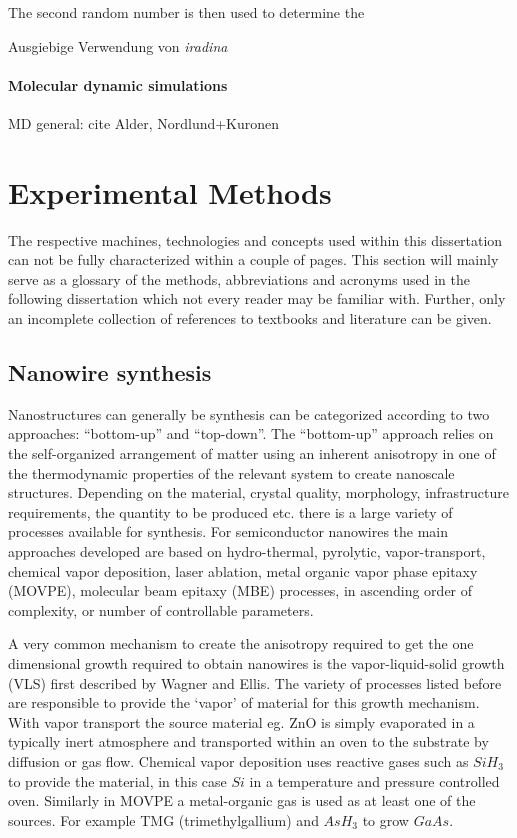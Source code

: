  The second random number is then used to determine the 


Ausgiebige Verwendung von \emph{iradina} \cite{borschel_ion_2011}



\subsubsection{Molecular dynamic simulations}

MD general: cite Alder, Nordlund+Kuronen


\chapter{Experimental Methods}

The respective machines, technologies and concepts used within this dissertation can not be fully characterized within a couple of pages. This section will mainly serve as a glossary of the methods, abbreviations and acronyms used in the following dissertation which not every reader may be familiar with. Further, only an incomplete collection of references to textbooks and literature can be given. 

\section{Nanowire synthesis}

Nanostructures can generally be synthesis can be categorized according to two approaches: ``bottom-up'' and ``top-down''. The ``bottom-up'' approach relies on the self-organized arrangement of matter using an inherent anisotropy in one of the thermodynamic properties of the relevant system to create nanoscale structures. Depending on the material, crystal quality, morphology, infrastructure requirements, the quantity to be produced etc. there is a large variety of processes available for synthesis. For semiconductor nanowires the main approaches developed are based on hydro-thermal, pyrolytic, vapor-transport, chemical vapor deposition, laser ablation, metal organic vapor phase epitaxy (MOVPE), molecular beam epitaxy (MBE) processes, in ascending order of complexity, or number of controllable parameters. 

A very common mechanism to create the anisotropy required to get the one dimensional growth required to obtain nanowires is the vapor-liquid-solid growth (VLS) first described by Wagner and Ellis. The variety of processes listed before are responsible to provide the `vapor' of material for this growth mechanism. With vapor transport the source material eg. ZnO is simply evaporated in a typically inert atmosphere and transported within an oven to the substrate by diffusion or gas flow. Chemical vapor deposition uses reactive gases such as $SiH_3$ to provide the material, in this case $Si$ in a temperature and pressure controlled oven. Similarly in MOVPE a metal-organic gas is used as at least one of the sources. For example TMG (trimethylgallium) and $AsH_3$ to grow $GaAs$.

